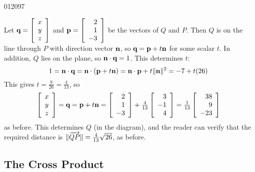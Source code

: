 \begin{example}{}{012097}
\begin{solution}[2]
Let $\textbf{q}= \left[
\begin{array}{c}
x\\
y \\
z
\end{array}
\right]$
and $\textbf{p} = \left[
\begin{array}{r}
2\\
1 \\
-3
\end{array}
\right]$
 be the vectors of $Q$ and $P$. Then $Q$ is on the line through $P$ with direction vector $\textbf{n}$, so $\textbf{q} = \textbf{p} + t\textbf{n}$ for some scalar $t$. In addition, $Q$ lies on the plane, so $\textbf{n} \cdot \textbf{q} = 1$. This determines $t$:
\begin{equation*}
1 = \textbf{n} \cdot \textbf{q} = \textbf{n} \cdot (\textbf{p} + t\textbf{n}) = \textbf{n} \cdot \textbf{p} + t\| \textbf{n} \|^2 = -7 + t(26)
\end{equation*}
This gives $t = \frac{8}{26} = \frac{4}{13}$, so
\begin{equation*}
\left[
\begin{array}{c}
x\\
y \\
z
\end{array}
\right] 
= \textbf{q} = \textbf{p} + t\textbf{n} = 
\left[
\begin{array}{r}
2\\
1 \\
-3
\end{array}
\right]
+ \tfrac{4}{13}
\left[
\begin{array}{r}
3\\
-1 \\
4
\end{array}
\right]
= \tfrac{1}{13}
\left[
\begin{array}{r}
38\\
9 \\
-23
\end{array}
\right]
\end{equation*}
as before. This determines $Q$ (in the diagram), and the reader can verify that the required distance is $\| \overrightarrow{QP} \| = \tfrac{4}{13}\sqrt{26}$, as before.
\end{solution}
\end{example}

\vspace*{-1em}
\subsection*{The Cross Product}


